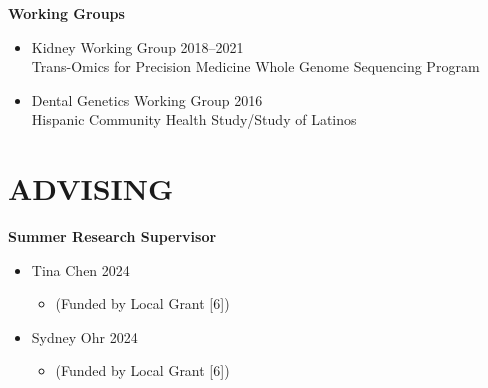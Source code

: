 \documentclass[margin]{res}
\begin{document}
\begin{resume}
\hspace{0.1cm}\textbf{Working Groups}
\begin{itemize} %
\item Kidney Working Group \hfill 2018--2021 \\ Trans-Omics for Precision Medicine Whole Genome Sequencing Program 
\item Dental Genetics Working Group \hfill 2016 \\ Hispanic Community Health Study/Study of Latinos \\
\end{itemize}
						




\section{ADVISING}	

\textbf{Summer Research Supervisor}
\begin{itemize}
\item Tina Chen \hfill 2024
	\begin{itemize}[leftmargin=-0in] \vspace{-0.2cm}
	\item[]\begin{footnotesize}(Funded by Local Grant [6]) \end{footnotesize}
	\end{itemize}
	
\item Sydney Ohr \hfill 2024 
	\begin{itemize}[leftmargin=-0in] \vspace{-0.2cm}
	\item[]\begin{footnotesize}(Funded by Local Grant [6]) \end{footnotesize}
	\end{itemize}
	

\end{itemize}
\end{resume}
\end{document}
